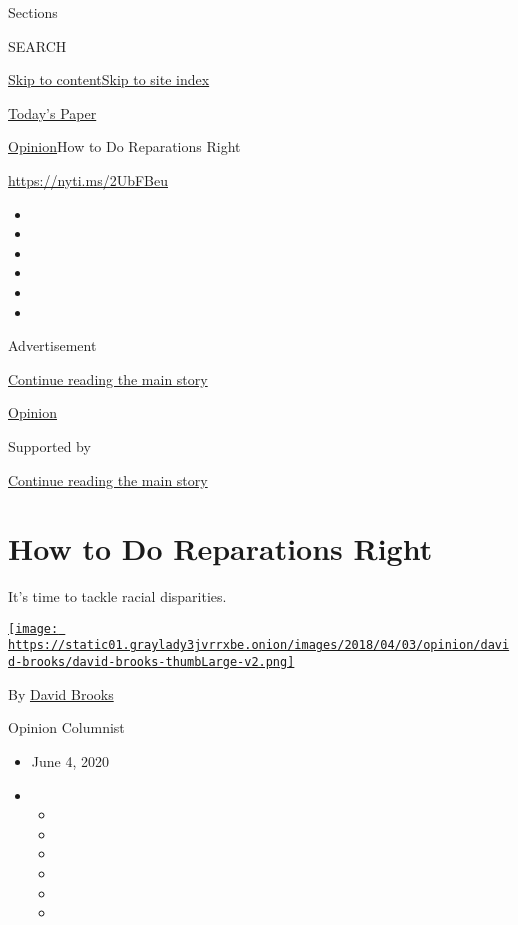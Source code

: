 Sections

SEARCH

\protect\hyperlink{site-content}{Skip to
content}\protect\hyperlink{site-index}{Skip to site index}

\href{https://myaccount.nytimes3xbfgragh.onion/auth/login?response_type=cookie\&client_id=vi}{}

\href{https://www.nytimes3xbfgragh.onion/section/todayspaper}{Today's
Paper}

\href{/section/opinion}{Opinion}\textbar{}How to Do Reparations Right

\url{https://nyti.ms/2UbFBeu}

\begin{itemize}
\item
\item
\item
\item
\item
\item
\end{itemize}

Advertisement

\protect\hyperlink{after-top}{Continue reading the main story}

\href{/section/opinion}{Opinion}

Supported by

\protect\hyperlink{after-sponsor}{Continue reading the main story}

\hypertarget{how-to-do-reparations-right}{%
\section{How to Do Reparations
Right}\label{how-to-do-reparations-right}}

It's time to tackle racial disparities.

\href{https://www.nytimes3xbfgragh.onion/by/david-brooks}{\texttt{[image: https://static01.graylady3jvrrxbe.onion/images/2018/04/03/opinion/david-brooks/david-brooks-thumbLarge-v2.png]}}

By \href{https://www.nytimes3xbfgragh.onion/by/david-brooks}{David
Brooks}

Opinion Columnist

\begin{itemize}
\item
  June 4, 2020
\item
  \begin{itemize}
  \item
  \item
  \item
  \item
  \item
  \item
  \end{itemize}
\end{itemize}

